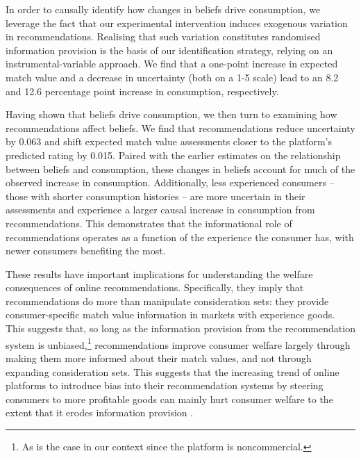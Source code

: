 \documentclass[12pt]{article}
\theoremstyle{newtheorem}
\begin{document}
In order to causally identify how changes in beliefs drive consumption, we leverage the fact that our experimental intervention induces exogenous variation in recommendations. 
Realising that such variation constitutes randomised information provision \citep{HaalandRothWohlfart2023JEL} is the basis of our identification strategy, relying on an instrumental-variable approach. 
We find that a one-point increase in expected match value and a decrease in uncertainty (both on a 1-5 scale) lead to an 8.2 and 12.6 percentage point increase in consumption, respectively.


Having shown that beliefs drive consumption, we then turn to examining how recommendations affect beliefs.
We find that recommendations reduce uncertainty by 0.063 and shift expected match value assessments closer to the platform's predicted rating by 0.015. 
Paired with the earlier estimates on the relationship between beliefs and consumption, these changes in beliefs account for much of the observed increase in consumption. 
Additionally, less experienced consumers -- those with shorter consumption histories -- are more uncertain in their assessments and experience a larger causal increase in consumption from recommendations. 
This demonstrates that the informational role of recommendations operates as a function of the experience the consumer has, with newer consumers benefiting the most.


These results have important implications for understanding the welfare consequences of online recommendations.
Specifically, they imply that recommendations do more than manipulate consideration sets: they provide consumer-specific match value information in markets with experience goods. 
This suggests that, so long as the information provision from the recommendation system is unbiased,\footnote{
    As is the case in our context since the platform is noncommercial.
} 
recommendations improve consumer welfare largely through making them more informed about their match values, and not through expanding consideration sets. 
This suggests that the increasing trend of online platforms to introduce bias into their recommendation systems by steering consumers to more profitable goods can mainly hurt consumer welfare to the extent that it erodes information provision \citep{ArmstrongVickersZhou2009RAND, HagiuJullien2011RAND, CalvanoCalzolariDenicoloPastorello2022WP}.
\end{document}
